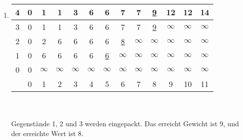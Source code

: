 \documentclass[a4paper]{scrartcl}
\begin{document}
\begin{enumerate}[label=\bfseries \arabic*.]
\begin{enumerate}
    \item %
        \begin{tabular}[t]{c||c|c|c|c|c|c|c|c|c|c|c|c|}
            4 & 0 & 1 & 1 & 3 & 6 & 6 & 7 & 7 & \underline{9} & 12 & 12 & 14 \\ \hline
            3 & 0 & 1 & 1 & 3 & 6 & 6 & 7 & 7 & \underline{9} & $\infty$ & $\infty$ & $\infty$ \\ \hline
            2 & 0 & 2 & 6 & 6 & 6 & 6 & \underline{8} & $\infty$ & $\infty$ & $\infty$ & $\infty$ & $\infty$ \\ \hline
            1 & 0 & 6 & 6 & 6 & 6 & \underline{6} & $\infty$ & $\infty$ & $\infty$ & $\infty$ & $\infty$ & $\infty$ \\ \hline
            0 & 0 & $\infty$ & $\infty$ & $\infty$ & $\infty$ & $\infty$ & $\infty$ & $\infty$ & $\infty$ & $\infty$ & $\infty$ & $\infty$ \\ \hhline{=#=|=|=|=|=|=|=|=|=|=|=|=|}
              & 0 & 1 & 2 & 3 & 4 & 5 & 6 & 7 & 8 & 9 & 10 & 11 \\
        \end{tabular}
        \\ \\
        Gegenstände 1, 2 und 3 werden eingepackt. Das erreicht Gewicht ist 9,
        und der erreichte Wert ist 8.

\end{enumerate}
\end{enumerate}
\end{document}
